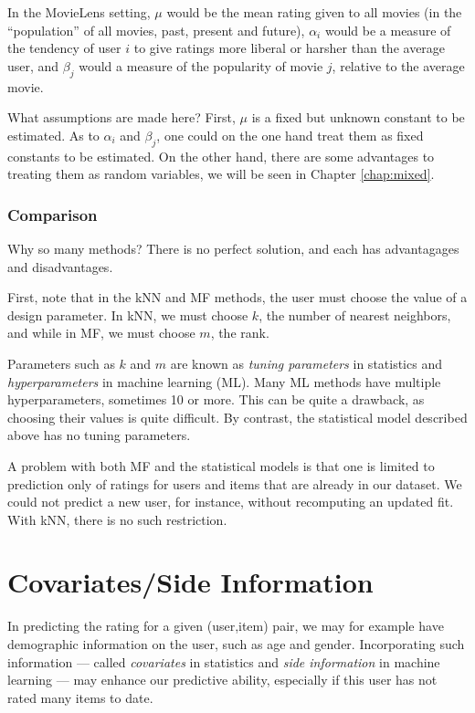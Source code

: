 In the MovieLens setting, $\mu$ would be the mean rating given to all
movies (in the ``population'' of all movies, past, present and future),
$\alpha_i$ would be a measure of the tendency of user $i$ to give
ratings more liberal or harsher than the average user, and $\beta_j$
would a measure of the popularity of movie $j$, relative to the average
movie.

What assumptions are made here?  First, $\mu$ is a fixed but unknown
constant to be estimated.  As to $\alpha_i$ and $\beta_j$, one could on
the one hand treat them as fixed constants to be estimated.  On the
other hand, there are some advantages to treating them as random
variables, we will be seen in Chapter \ref{chap:mixed}.

\subsubsection{Comparison}

Why so many methods?  There is no perfect solution, and each has
advantagages and disadvantages.

First, note that in the kNN and MF methods, the user must choose the
value of a design parameter.  In kNN, we must choose $k$, the number of
nearest neighbors, and while in MF, we must choose $m$, the rank.

Parameters such as $k$ and $m$ are known as \textit{tuning parameters}
in statistics and \textit{hyperparameters} in machine learning (ML).
Many ML methods have multiple hyperparameters, sometimes 10 or more.
This can be quite a drawback, as choosing their values is quite
difficult.  By contrast, the statistical model described above has no
tuning parameters.

A problem with both MF and the statistical models is that one is limited
to prediction only of ratings for users and items that are already in
our dataset.  We could not predict a new user, for instance, without
recomputing an updated fit.  With kNN, there is no such restriction.

\section{Covariates/Side Information}

In predicting the rating for a given (user,item) pair, we may for
example have demographic information on the user, such as age and
gender.  Incorporating such information --- called \textit{covariates}
in statistics and \textit{side information} in machine learning --- may
enhance our predictive ability, especially if this user has not rated
many items to date.

